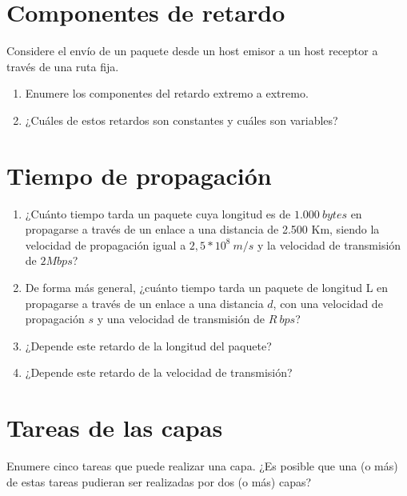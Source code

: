 \documentclass[12pt]{report}
\begin{document}
\section{Componentes de retardo \stwo \steo}
Considere el envío de un paquete desde un host emisor a un host receptor a través de una ruta fija.

\begin{enumerate}
\item Enumere los componentes del retardo extremo a extremo.
\item ¿Cuáles de estos retardos son constantes y cuáles son variables?
\end{enumerate}

\section{Tiempo de propagación \sfour}

\begin{enumerate}
\item ¿Cuánto tiempo tarda un paquete cuya longitud es de $1.000\ bytes$ en propagarse a través de un enlace a una distancia de 2.500 Km, siendo la velocidad de propagación igual a $ 2,5 * 10^{8}\ m/s $ y la velocidad de transmisión de $2 Mbps$?
\item De forma más general, ¿cuánto tiempo tarda un paquete de longitud L en propagarse a través de un enlace a una distancia $d$, con una velocidad de propagación $s$ y una velocidad de transmisión de $R\ bps$?
\item ¿Depende este retardo de la longitud del paquete?
\item ¿Depende este retardo de la velocidad de transmisión?
\end{enumerate}

\section{Tareas de las capas \stwo \steo}
Enumere cinco tareas que puede realizar una capa. ¿Es posible que una (o más) de estas tareas pudieran ser realizadas por dos (o más) capas?
\end{document}
